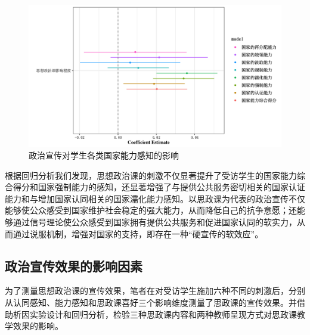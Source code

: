 \documentclass[
  12pt,
]{ctexart}
\begin{document}
\begin{figure}[h]
\includegraphics[width=1\linewidth]{../figures/figure3} \caption{政治宣传对学生各类国家能力感知的影响}\label{fig:unnamed-chunk-7}
\end{figure}

根据回归分析我们发现，思想政治课的刺激不仅显著提升了受访学生的国家能力综合得分和国家强制能力的感知，还显著增强了与提供公共服务密切相关的国家认证能力和与增加国家认同相关的国家濡化能力感知。以思政课为代表的政治宣传不仅能够使公众感受到国家维护社会稳定的强大能力，从而降低自己的抗争意愿；还能够通过信号理论使公众感受到国家拥有提供公共服务和促进国家认同的软实力，从而通过说服机制，增强对国家的支持，即存在一种``硬宣传的软效应''。

\hypertarget{ux653fux6cbbux5ba3ux4f20ux6548ux679cux7684ux5f71ux54cdux56e0ux7d20}{%
\subsection{政治宣传效果的影响因素}\label{ux653fux6cbbux5ba3ux4f20ux6548ux679cux7684ux5f71ux54cdux56e0ux7d20}}

为了测量思想政治课的宣传效果，笔者在对受访学生施加六种不同的刺激后，分别从认同感知、能力感知和思政课喜好三个影响维度测量了思政课的宣传效果。并借助析因实验设计和回归分析，检验三种思政课内容和两种教师呈现方式对思政课教学效果的影响。

\providecommand{\docline}[3]{\noalign{\global\setlength{\arrayrulewidth}{#1}}\arrayrulecolor[HTML]{#2}\cline{#3}}

\setlength{\tabcolsep}{2pt}

\renewcommand*{\arraystretch}{1.5}
\end{document}
